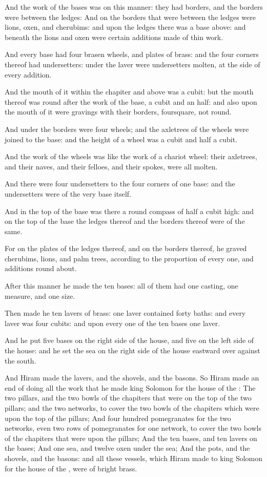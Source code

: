 \verse And the work of the bases was on this manner: they had borders, and the borders were between the ledges: \verse And on the borders that were between the ledges were lions, oxen, and cherubims: and upon the ledges there was a base above: and beneath the lions and oxen were certain additions made of thin work.

\verse And every base had four brasen wheels, and plates of brass: and the four corners thereof had undersetters: under the laver were undersetters molten, at the side of every addition.

\verse And the mouth of it within the chapiter and above was a cubit: but the mouth thereof was round after the work of the base, a cubit and an half: and also upon the mouth of it were gravings with their borders, foursquare, not round.

\verse And under the borders were four wheels; and the axletrees of the wheels were joined to the base: and the height of a wheel was a cubit and half a cubit.

\verse And the work of the wheels was like the work of a chariot wheel: their axletrees, and their naves, and their felloes, and their spokes, were all molten.

\verse And there were four undersetters to the four corners of one base: and the undersetters were of the very base itself.

\verse And in the top of the base was there a round compass of half a cubit high: and on the top of the base the ledges thereof and the borders thereof were of the same.

\verse For on the plates of the ledges thereof, and on the borders thereof, he graved cherubims, lions, and palm trees, according to the proportion of every one, and additions round about.

\verse After this manner he made the ten bases: all of them had one casting, one measure, and one size.

\verse Then made he ten lavers of brass: one laver contained forty baths: and every laver was four cubits: and upon every one of the ten bases one laver.

\verse And he put five bases on the right side of the house, and five on the left side of the house: and he set the sea on the right side of the house eastward over against the south.

\verse And Hiram made the lavers, and the shovels, and the basons. So Hiram made an end of doing all the work that he made king Solomon for the house of the \LORD: \verse The two pillars, and the two bowls of the chapiters that were on the top of the two pillars; and the two networks, to cover the two bowls of the chapiters which were upon the top of the pillars; \verse And four hundred pomegranates for the two networks, even two rows of pomegranates for one network, to cover the two bowls of the chapiters that were upon the pillars; \verse And the ten bases, and ten lavers on the bases; \verse And one sea, and twelve oxen under the sea; \verse And the pots, and the shovels, and the basons: and all these vessels, which Hiram made to king Solomon for the house of the \LORD, were of bright brass.

